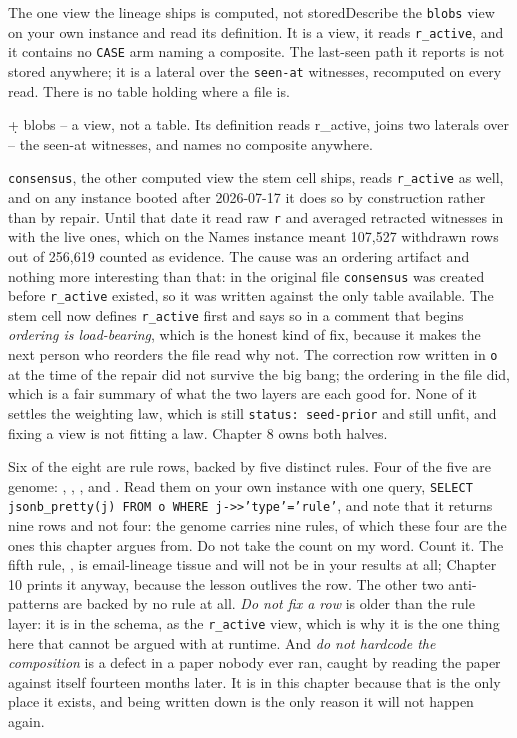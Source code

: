 \begin{Correspondence}{The one view the lineage ships is computed, not stored}{Describe the \texttt{blobs} view on your own instance and read its definition.}
It is a view, it reads \texttt{r\_active}, and it contains no \texttt{CASE} arm naming a composite. The last-seen path it reports is not stored anywhere; it is a lateral over the \texttt{seen-at} witnesses, recomputed on every read. There is no table holding where a file is.
\begin{Check}
\d+ blobs
-- a view, not a table. Its definition reads r_active, joins two laterals over
-- the seen-at witnesses, and names no composite anywhere.
\end{Check}
\texttt{consensus}, the other computed view the stem cell ships, reads \texttt{r\_active} as well, and on any instance booted after 2026-07-17 it does so by construction rather than by repair. Until that date it read raw \texttt{r} and averaged retracted witnesses in with the live ones, which on the Names instance meant 107{,}527 withdrawn rows out of 256{,}619 counted as evidence. The cause was an ordering artifact and nothing more interesting than that: in the original file \texttt{consensus} was created before \texttt{r\_active} existed, so it was written against the only table available. The stem cell now defines \texttt{r\_active} first and says so in a comment that begins \textit{ordering is load-bearing}, which is the honest kind of fix, because it makes the next person who reorders the file read why not. The correction row written in \texttt{o} at the time of the repair did not survive the big bang; the ordering in the file did, which is a fair summary of what the two layers are each good for. None of it settles the weighting law, which is still \texttt{status: seed-prior} and still unfit, and fixing a view is not fitting a law. Chapter 8 owns both halves.
\end{Correspondence}

\bigskip

Six of the eight are rule rows, backed by five distinct rules. Four of the five are genome: , , , and . Read them on your own instance with one query, \texttt{SELECT jsonb\_pretty(j) FROM o WHERE j->>'type'='rule'}, and note that it returns nine rows and not four: the genome carries nine rules, of which these four are the ones this chapter argues from. Do not take the count on my word. Count it. The fifth rule, , is email-lineage tissue and will not be in your results at all; Chapter 10 prints it anyway, because the lesson outlives the row. The other two anti-patterns are backed by no rule at all. \textit{Do not fix a row} is older than the rule layer: it is in the schema, as the \texttt{r\_active} view, which is why it is the one thing here that cannot be argued with at runtime. And \textit{do not hardcode the composition} is a defect in a paper nobody ever ran, caught by reading the paper against itself fourteen months later. It is in this chapter because that is the only place it exists, and being written down is the only reason it will not happen again.
